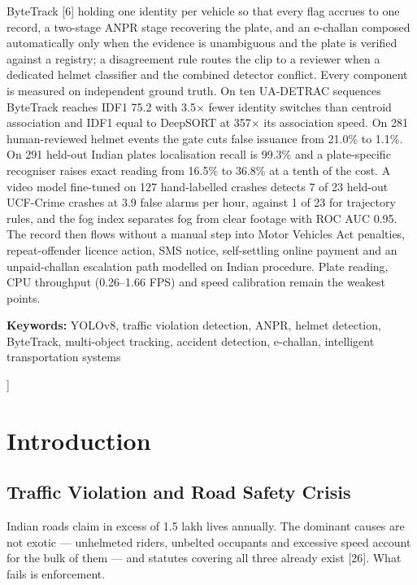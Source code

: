 \documentclass[10pt,a4paper,twocolumn]{article}
\begin{document}
{\begin{list}{}{\leftmargin=6mm\rightmargin=6mm}
ByteTrack [6] holding one identity per vehicle so that every flag accrues to one record, a two-stage ANPR stage
recovering the plate, and an e-challan composed automatically only when the evidence is unambiguous and the plate is
verified against a registry; a disagreement rule routes the clip to a reviewer when a dedicated helmet classifier and
the combined detector conflict. Every component is measured on independent ground truth. On ten UA-DETRAC sequences
ByteTrack reaches IDF1 75.2 with 3.5$\times$ fewer identity switches than centroid association and IDF1 equal to
DeepSORT at 357$\times$ its association speed. On 281 human-reviewed helmet events the gate cuts false issuance from
21.0\% to 1.1\%. On 291 held-out Indian plates localisation recall is 99.3\% and a plate-specific recogniser raises
exact reading from 16.5\% to 36.8\% at a tenth of the cost. A video model fine-tuned on 127 hand-labelled crashes
detects 7 of 23 held-out UCF-Crime crashes at 3.9 false alarms per hour, against 1 of 23 for trajectory rules, and the
fog index separates fog from clear footage with ROC AUC 0.95. The record then flows without a manual step into Motor
Vehicles Act penalties, repeat-offender licence action, SMS notice, self-settling online payment and an unpaid-challan
escalation path modelled on Indian procedure. Plate reading, CPU throughput (0.26--1.66 FPS) and speed calibration
remain the weakest points.
\end{list}
\vspace{2pt}
{\small\noindent\textbf{Keywords:} YOLOv8, traffic violation detection, ANPR, helmet detection, ByteTrack, multi-object
tracking, accident detection, e-challan, intelligent transportation systems\par}
\vspace{10pt}
}]

\section{Introduction}
\subsection{Traffic Violation and Road Safety Crisis}
Indian roads claim in excess of 1.5 lakh lives annually. The dominant causes are not exotic ---
unhelmeted riders, unbelted occupants and excessive speed account for the bulk of them --- and statutes covering all
three already exist [26]. What fails is enforcement.
\end{document}
